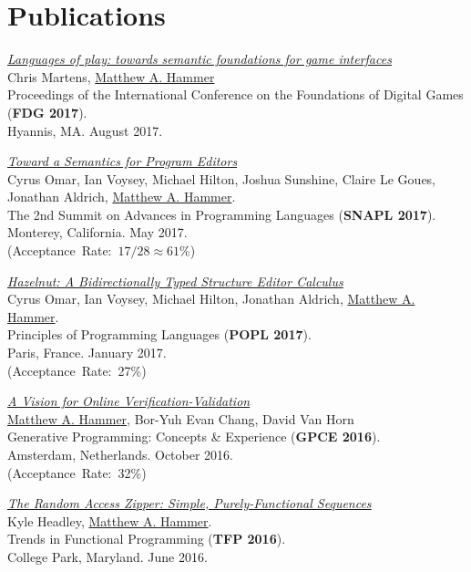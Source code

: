 \documentclass[10pt,letterpaper]{article}
\newcommand{\BeanCounter}[1]{(Acceptance~Rate:~#1\%)}
\renewenvironment{itemize}{
  \begin{list}{}{
    \setlength{\leftmargin}{1.5em}
    \setlength{\itemsep}{0.25em}
    \setlength{\parskip}{0pt}
    \setlength{\parsep}{0.25em}
  }
}{
  \end{list}
}
\begin{document}
\section*{Publications}
\begin{itemize}

\item
\href{https://arxiv.org/abs/1703.05410}
{\textit{Languages of play: towards semantic foundations for game interfaces}}
\\
Chris Martens, \underline{Matthew A. Hammer}
\\
Proceedings of the International Conference on the Foundations of Digital Games (\textbf{FDG 2017}).
\\
Hyannis, MA. August 2017.

\item
\href{http://hazelgrove.org/docs/hazel-vision-tr.pdf}{\textit{Toward a Semantics for Program Editors}}
\\
Cyrus Omar, Ian Voysey, Michael Hilton, Joshua Sunshine, Claire Le Goues, Jonathan Aldrich, \underline{Matthew A. Hammer}.
\\
The 2nd Summit on Advances in Programming Languages (\textbf{SNAPL 2017}).
\\
Monterey, California. May 2017.
\\
\BeanCounter{$17/28 \approx 61$}

\item
\href{https://arxiv.org/abs/1607.04180}{\textit{Hazelnut: A Bidirectionally Typed Structure Editor Calculus}}
\\
Cyrus Omar, Ian Voysey, Michael Hilton, Jonathan Aldrich, \underline{Matthew A. Hammer}.
\\
Principles of Programming Languages (\textbf{POPL 2017}).
\\
Paris, France. January 2017.
\\
\BeanCounter{27}

\item
\href{https://arxiv.org/abs/1608.06012}{\textit{A Vision for Online Verification-Validation}}
\\
\underline{Matthew A. Hammer}, Bor-Yuh Evan Chang, David Van Horn
\\
Generative Programming: Concepts \& Experience (\textbf{GPCE 2016}).
\\
Amsterdam, Netherlands. October 2016.
\\
\BeanCounter{32}

\item
\href{https://arxiv.org/abs/1608.06009}{\textit{The Random Access Zipper: Simple, Purely-Functional Sequences}}
\\
Kyle Headley, \underline{Matthew A. Hammer}.
\\
Trends in Functional Programming (\textbf{TFP 2016}).
\\
College Park, Maryland. June 2016. 


\end{itemize}
\end{document}
